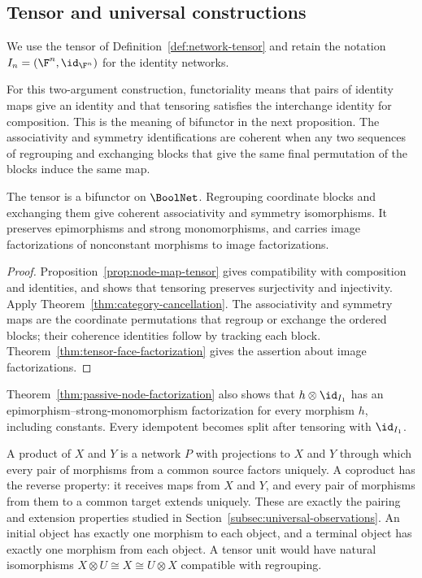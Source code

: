 \subsection{Tensor and universal constructions}\label{subsec:category-tensor}

We use the tensor of Definition~\ref{def:network-tensor} and retain the notation $I_n=(\F^n,\id_{\F^n})$ for the identity networks.

For this two-argument construction, functoriality means that pairs of identity maps give an identity and that tensoring satisfies the interchange identity for composition. This is the meaning of bifunctor in the next proposition. The associativity and symmetry identifications are coherent when any two sequences of regrouping and exchanging blocks that give the same final permutation of the blocks induce the same map.

\begin{proposition}\label{prop:category-tensor}
The tensor is a bifunctor on $\BoolNet$. Regrouping coordinate blocks and exchanging them give coherent associativity and symmetry isomorphisms. It preserves epimorphisms and strong monomorphisms, and carries image factorizations of nonconstant morphisms to image factorizations.
\end{proposition}

\begin{proof}
Proposition~\ref{prop:node-map-tensor} gives compatibility with composition and identities, and shows that tensoring preserves surjectivity and injectivity. Apply Theorem~\ref{thm:category-cancellation}. The associativity and symmetry maps are the coordinate permutations that regroup or exchange the ordered blocks; their coherence identities follow by tracking each block. Theorem~\ref{thm:tensor-face-factorization} gives the assertion about image factorizations.
\end{proof}

Theorem~\ref{thm:passive-node-factorization} also shows that $h\otimes\id_{I_1}$ has an epimorphism--strong-monomorphism factorization for every morphism $h$, including constants. Every idempotent becomes split after tensoring with $\id_{I_1}$.

A product of $X$ and $Y$ is a network $P$ with projections to $X$ and $Y$ through which every pair of morphisms from a common source factors uniquely. A coproduct has the reverse property: it receives maps from $X$ and $Y$, and every pair of morphisms from them to a common target extends uniquely. These are exactly the pairing and extension properties studied in Section~\ref{subsec:universal-observations}. An initial object has exactly one morphism to each object, and a terminal object has exactly one morphism from each object. A tensor unit would have natural isomorphisms $X\otimes U\cong X\cong U\otimes X$ compatible with regrouping.

